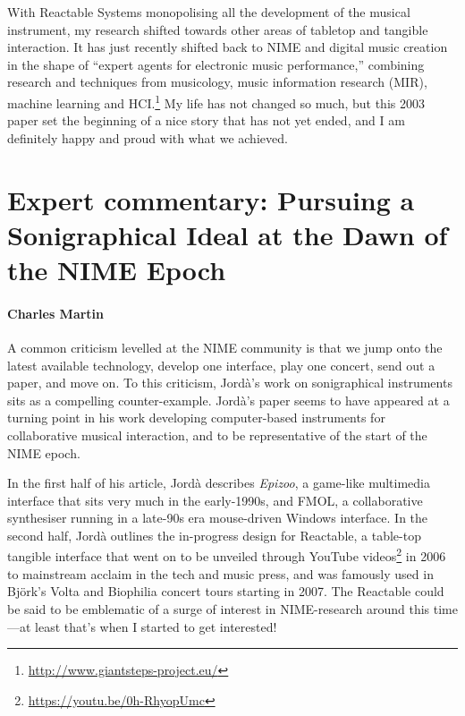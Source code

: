 With Reactable Systems monopolising all the development of the musical instrument, my research shifted towards other areas of tabletop and tangible interaction. It has just recently shifted back to NIME and digital music creation in the shape of ``expert agents for electronic music performance,'' combining research and techniques from musicology, music information research (MIR), machine learning and HCI.\footnote{\url{http://www.giantsteps-project.eu/}} My life has not changed so much, but this 2003 paper set the beginning of a nice story that has not yet ended, and I am definitely happy and proud with what we achieved.

\section*{Expert commentary: Pursuing a Sonigraphical Ideal at the Dawn of the NIME Epoch}
\paragraph{Charles Martin}

A common criticism levelled at the NIME community is that we jump onto the latest available technology, develop one interface, play one concert, send out a paper, and move on. To this criticism, Jord\`{a}'s work on sonigraphical instruments sits as a compelling counter-example.
Jord\`{a}'s paper seems to have appeared at a turning point in his work developing computer-based instruments for collaborative musical interaction, and to be representative of the start of the NIME epoch.

In the first half of his article, Jord\`{a} describes \textit{Epizoo}, a game-like multimedia interface that sits very much in the early-1990s, and FMOL, a collaborative synthesiser running in a late-90s era mouse-driven Windows interface. In the second half, Jord\`{a} outlines the in-progress design for Reactable, a table-top tangible interface that went on to be unveiled through YouTube videos\footnote{\url{https://youtu.be/0h-RhyopUmc}} in 2006 to mainstream acclaim in the tech and music press, and was famously used in Bj\"{o}rk's Volta \cite{Andrews:2007} and Biophilia concert tours starting in 2007. The Reactable could be said to be emblematic of a surge of interest in NIME-research around this time---at least that's when I started to get interested!

